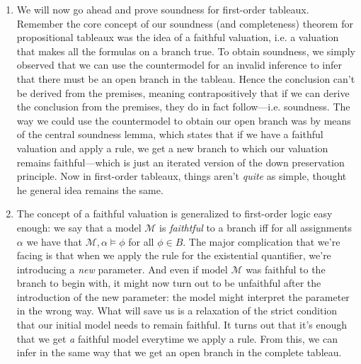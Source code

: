 	\begin{enumerate}[{\thesection}.1]

		\item We will now go ahead and prove soundness for
                  first-order tableaux. Remember the core
                  concept of our soundness (and completeness) theorem
                  for propositional tableaux was the idea of a
                  faithful valuation, i.e. a valuation that makes all
                  the formulas on a branch true. To obtain soundness,
                  we simply observed that we can use the countermodel
                  for an invalid inference to infer that there must be
                  an open branch in the tableau. Hence the conclusion
                  can't be derived from the premises, meaning
                  contrapositively that if we can derive the
                  conclusion from the premises, they do in fact
                  follow---i.e. soundness. The way we could use the
                  countermodel to obtain our open branch was by means
                  of the central soundness lemma, which states that if
                  we have a faithful valuation and apply a rule, we
                  get a new branch to which our valuation remains
                  faithful---which is just an iterated version of the
                  down preservation principle. Now in first-order
                  tableaux, things aren't \emph{quite} as simple,
                  thought he general idea remains the same.

                  \item The
                  concept of a faithful valuation is generalized to
                  first-order logic easy enough: we say that a model
                  $\mathcal{M}$ is \emph{faithtful} to a branch iff for all
                  assignments $\alpha$ we have that
                  $\mathcal{M},\alpha\vDash \phi$ for all $\phi\in
                  B$. The major
                  complication that we're facing is that when we apply
                  the rule for the existential quantifier, we're
                  introducing a \emph{new} parameter. And even if
                  model $\mathcal{M}$ was faithful to the branch to
                  begin with,
                  it might now turn out to be unfaithful after the
                  introduction of the new parameter: the model might
                  interpret the parameter in the wrong way.  What will
                  save us is a relaxation of the strict
                  condition that our initial model needs to remain
                  faithful. It turns out that it's enough that we get
                  \emph{a} faithful model everytime we apply a
                  rule. From this, we can infer in the same way that
                  we get an open branch in the complete tableau.


\end{enumerate}

